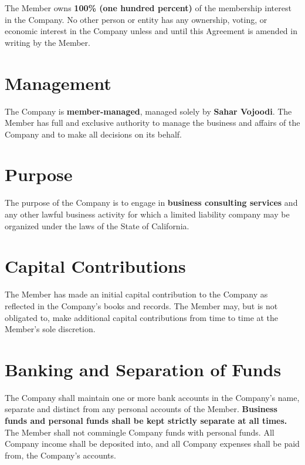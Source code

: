 \documentclass{toospoint}
\begin{document}
The Member owns \textbf{100\% (one hundred percent)} of the membership
interest in the Company. No other person or entity has any ownership,
voting, or economic interest in the Company unless and until this Agreement
is amended in writing by the Member.

\section{Management}

The Company is \textbf{member-managed}, managed solely by \textbf{Sahar
Vojoodi}. The Member has full and exclusive authority to manage the
business and affairs of the Company and to make all decisions on its behalf.

\section{Purpose}

The purpose of the Company is to engage in \textbf{business consulting
services} and any other lawful business activity for which a limited
liability company may be organized under the laws of the State of
California.

\section{Capital Contributions}

The Member has made an initial capital contribution to the Company as
reflected in the Company's books and records. The Member may, but is not
obligated to, make additional capital contributions from time to time at
the Member's sole discretion.

\section{Banking and Separation of Funds}

The Company shall maintain one or more bank accounts in the Company's name,
separate and distinct from any personal accounts of the Member.
\textbf{Business funds and personal funds shall be kept strictly separate at
all times.} The Member shall not commingle Company funds with personal
funds. All Company income shall be deposited into, and all Company
expenses shall be paid from, the Company's accounts.
\end{document}
